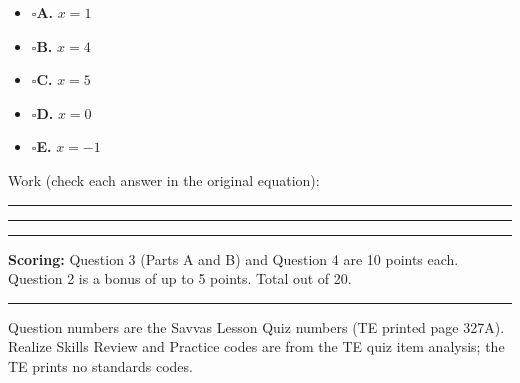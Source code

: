 \documentclass[11pt]{article}
\newcommand{\checkbox}{$\square$\;}
\begin{document}
\begin{minipage}[t]{0.30\textwidth}
\begin{itemize}[leftmargin=1.2em, itemsep=2pt]
\item[] \checkbox \textbf{A.} $x=1$
\item[] \checkbox \textbf{B.} $x=4$
\item[] \checkbox \textbf{C.} $x=5$
\item[] \checkbox \textbf{D.} $x=0$
\item[] \checkbox \textbf{E.} $x=-1$
\end{itemize}
\end{minipage}\hfill
\begin{minipage}[t]{0.66\textwidth}
Work (check each answer in the original equation):

\vspace{10pt}\rule{\linewidth}{0.4pt}

\vspace{14pt}\rule{\linewidth}{0.4pt}

\vspace{14pt}\rule{\linewidth}{0.4pt}
\end{minipage}

\vfill
\noindent\textbf{Scoring:} Question 3 (Parts A and B) and Question 4 are 10 points each. Question 2 is a bonus of up to 5 points. Total out of 20.

\newpage
{}

\vspace{4pt}\noindent\rule{\textwidth}{0.6pt}

Question numbers are the Savvas Lesson Quiz numbers (TE printed page 327A). Realize Skills Review and Practice codes are from the TE quiz item analysis; the TE prints no standards codes.
\end{document}
